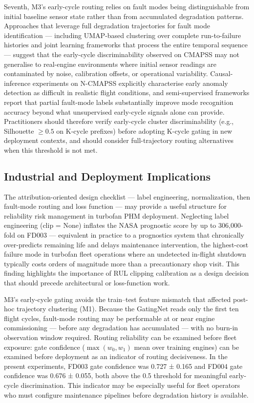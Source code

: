 \documentclass[review,12pt]{elsarticle}
\begin{document}
Seventh, M3's early-cycle routing relies on fault modes being distinguishable from initial baseline sensor state rather than from accumulated degradation patterns. Approaches that leverage full degradation trajectories for fault mode identification \cite{ref46,ref47} — including UMAP-based clustering over complete run-to-failure histories and joint learning frameworks that process the entire temporal sequence — suggest that the early-cycle discriminability observed on CMAPSS may not generalise to real-engine environments where initial sensor readings are contaminated by noise, calibration offsets, or operational variability. Causal-inference experiments on N-CMAPSS \cite{ref48} explicitly characterise early anomaly detection as difficult in realistic flight conditions, and semi-supervised frameworks \cite{ref49} report that partial fault-mode labels substantially improve mode recognition accuracy beyond what unsupervised early-cycle signals alone can provide. Practitioners should therefore verify early-cycle cluster discriminability (e.g., Silhouette $\geq 0.5$ on K-cycle prefixes) before adopting K-cycle gating in new deployment contexts, and should consider full-trajectory routing alternatives when this threshold is not met.

\subsection{Industrial and Deployment Implications}

The attribution-oriented design checklist — label engineering, normalization, then fault-mode routing and loss function — may provide a useful structure for reliability risk management in turbofan PHM deployment. Neglecting label engineering (clip = None) inflates the NASA prognostic score by up to 306,000-fold on FD003 — equivalent in practice to a prognostics system that chronically over-predicts remaining life and delays maintenance intervention, the highest-cost failure mode in turbofan fleet operations where an undetected in-flight shutdown typically costs orders of magnitude more than a precautionary shop visit. This finding highlights the importance of RUL clipping calibration as a design decision that should precede architectural or loss-function work.

M3's early-cycle gating avoids the train--test feature mismatch that affected post-hoc trajectory clustering (M1). Because the GatingNet reads only the first ten flight cycles, fault-mode routing may be performable at or near engine commissioning --- before any degradation has accumulated --- with no burn-in observation window required. Routing reliability can be examined before fleet exposure: gate confidence ($\max(w_0, w_1)$ mean over training engines) can be examined before deployment as an indicator of routing decisiveness. In the present experiments, FD003 gate confidence was 0.727 ± 0.165 and FD004 gate confidence was 0.676 ± 0.055, both above the 0.5 threshold for meaningful early-cycle discrimination. This indicator may be especially useful for fleet operators who must configure maintenance pipelines before degradation history is available.
\end{document}

